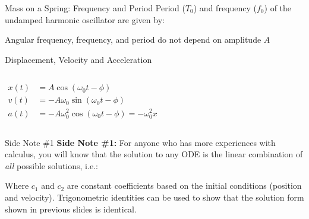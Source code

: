 \documentclass[12pt,compress,aspectratio=169]{beamer}
\begin{document}
\begin{frame}{Mass on a Spring: Frequency and Period}
  Period ($T_0$) and frequency ($f_0$) of the undamped harmonic oscillator are
  given by:

  
  Angular frequency, frequency, and period do not depend on amplitude $A$
\end{frame}



\begin{frame}{Displacement, Velocity and Acceleration}
  \begin{columns}

    \begin{align*}
      x(t)&=A\cos(\omega_0 t-\phi)\\
      v(t)&=-A\omega_0\sin(\omega_0 t-\phi)\\
      a(t)&=-A\omega_0^2\cos(\omega_0 t-\phi)=-\omega_0^2x
    \end{align*}

  \end{columns}
\end{frame}



\begin{frame}{Side Note \#1}
  \textbf{Side Note \#1:} For anyone who has more experiences with calculus,
  you will know that the solution to any ODE is the linear combination of
  \emph{all} possible solutions, i.e.:


  Where $c_1$ and $c_2$ are constant coefficients based on the initial
  conditions (position and velocity). Trigonometric identities can be used to
  show that the solution form shown in previous slides is identical.
\end{frame}
\end{document}
